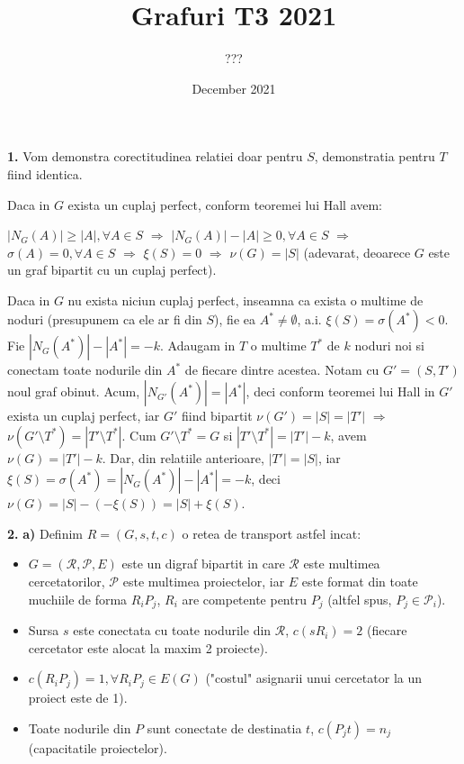 \documentclass{article}
\title{Grafuri T3 2021}
\author{???}
\date{December 2021}
\begin{document}
\maketitle


{\bf 1.} Vom demonstra corectitudinea relatiei doar pentru $S$, demonstratia pentru $T$ fiind identica.

Daca in $G$ exista un cuplaj perfect, conform teoremei lui Hall avem:

$|N_G(A)| \geq |A|, \forall A \in S$ $\Rightarrow$ $|N_G(A)| - |A| \geq 0, \forall A \in S$ $\Rightarrow$ $\sigma(A) = 0, \forall A \in S$ $\Rightarrow$ $\xi(S) = 0$ $\Rightarrow$ $\nu(G) = |S|$ (adevarat, deoarece $G$ este un graf bipartit cu un cuplaj perfect).

Daca in $G$ nu exista niciun cuplaj perfect, inseamna ca exista o multime de noduri (presupunem ca ele ar fi din $S$), fie ea $A^* \neq \emptyset$, a.i. $\xi(S) = \sigma(A^*) < 0$. Fie $|N_G(A^*)| - |A^*| = -k$. Adaugam in $T$ o multime $T^*$ de $k$ noduri noi si conectam toate nodurile din $A^*$ de fiecare dintre acestea. Notam cu $G' = (S, T')$ noul graf obinut. Acum, $|N_{G'}(A^*)| = |A^*|$, deci conform teoremei lui Hall in $G'$ exista un cuplaj perfect, iar $G'$ fiind bipartit $\nu(G') = |S| = |T'|$ $\Rightarrow$ $\nu(G' \setminus T^*) = |T' \setminus T^*|$. Cum $G' \setminus T^* = G$ si $|T' \setminus T^*| = |T'| - k$, avem $\nu(G) = |T'| - k$. Dar, din relatiile anterioare, $|T'| = |S|$, iar  $\xi(S) = \sigma(A^*) = |N_G(A^*)| - |A^*| = -k$, deci $\nu(G) = |S| - (-\xi(S)) = |S| + \xi(S)$.


{\bf 2.} {\bf a)} Definim $R=(G, s, t, c)$ o retea de transport astfel incat:
\begin{itemize}
    \item $G = (\mathcal{R}, \mathcal{P}, E)$ este un digraf bipartit in care $\mathcal{R}$ este multimea cercetatorilor, $\mathcal{P}$ este multimea proiectelor, iar $E$ este format din toate muchiile de forma $R_iP_j$, $R_i$ are competente pentru $P_j$ (altfel spus, $P_j \in \mathcal{P}_i$).
    \item Sursa $s$ este conectata cu toate nodurile din $\mathcal{R}$, $c(sR_i) = 2$ (fiecare cercetator este alocat la maxim 2 proiecte).
    \item $c(R_iP_j) = 1, \forall R_iP_j \in E(G)$ ("costul" asignarii unui cercetator la un proiect este de 1).
    \item Toate nodurile din $P$ sunt conectate de destinatia $t$, $c(P_jt) = n_j$ (capacitatile proiectelor).
\end{itemize}
\end{document}
